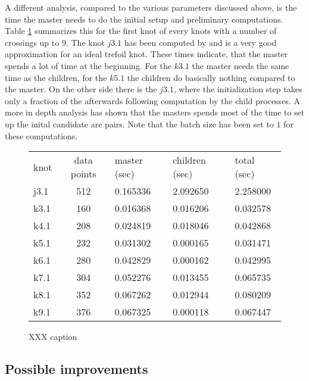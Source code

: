 \documentclass{article}
\begin{document}
A different analysis, compared to the various parameters discussed above, is
the time the master needs to do the initial setup and preliminary computations.
Table \ref{tab:master_slave_timing} summarizes this for the first knot of every knots
with a number of crossings up to $9$. The knot $j3.1$ has been computed by \cite{XXX}
and is a very good approximation for an ideal trefoil knot. These times indicate,
that the master spends a lot of time at the beginning. For the $k3.1$ the master
needs the same time as the children, for the $k5.1$ the children do basically
nothing compared to the master. On the other side there is the $j3.1$, where
the initialization step takes only a fraction of the afterwards following
computation by the child processes. A more in depth analysis has shown that
the masters spends most of the time to set up the inital candidate arc pairs.
Note that the batch size has been set to $1$ for these computations.

\begin{figure}
\begin{center}
\begin{tabular}{lclll}
knot & data points & master (sec) & children (sec) & total (sec) \\
j3.1 & 512 & 0.165336 & 2.092650 & 2.258000 \\
k3.1 & 160 & 0.016368 & 0.016206 & 0.032578 \\
k4.1 & 208 & 0.024819 & 0.018046 & 0.042868 \\
k5.1 & 232 & 0.031302 & 0.000165 & 0.031471 \\
k6.1 & 280 & 0.042829 & 0.000162 & 0.042995 \\
k7.1 & 304 & 0.052276 & 0.013455 & 0.065735 \\
k8.1 & 352 & 0.067262 & 0.012944 & 0.080209 \\
k9.1 & 376 & 0.067325 & 0.000118 & 0.067447
\end{tabular}
\end{center}
\caption{XXX caption \label{tab:master_slave_timing} }
\end{figure}

\subsection{Possible improvements}
\end{document}
